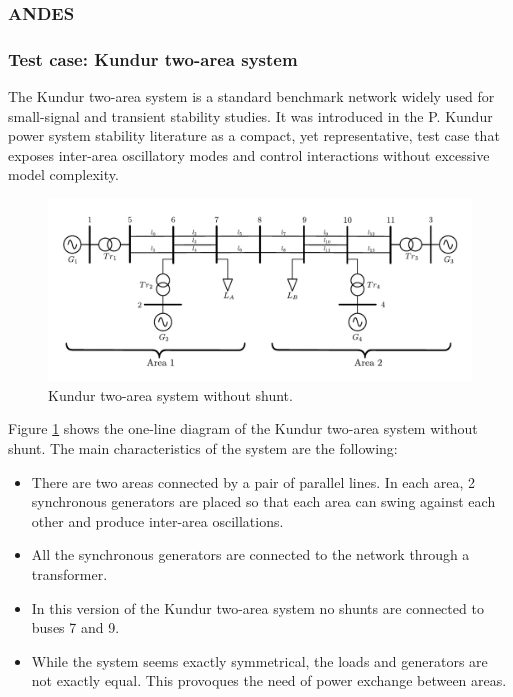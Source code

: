 \subsubsection{ANDES}

\subsubsection{Test case: Kundur two-area system}

The Kundur two-area system is a standard benchmark network widely used for small-signal and transient stability studies.
 It was introduced in the P. Kundur power system stability literature \cite{StabilityAndControlKundur} as a compact, yet representative, test case that exposes 
 inter-area oscillatory modes and control interactions without excessive model complexity.

\begin{figure}[h!]
    \centering
    \includegraphics[width=1\linewidth]{inkscape_svg/Kundur_system_no_shunt.pdf}
    \caption{Kundur two-area system without shunt.}
    \label{fig:kundur_system}
\end{figure}

Figure \ref{fig:kundur_system} shows the one-line diagram of the Kundur two-area system without shunt. The main characteristics of the system are the following:
\begin{itemize}
    \item There are two areas connected by a pair of parallel lines. In each area, 2 synchronous generators are placed so that each area can swing against 
    each other and produce inter-area oscillations.
    \item All the synchronous generators are connected to the network through a transformer.
    \item In this version of the Kundur two-area system no shunts are connected to buses 7 and 9.
    \item While the system seems exactly symmetrical, the loads and generators are not exactly equal. This provoques the need of power exchange between areas.
\end{itemize}

